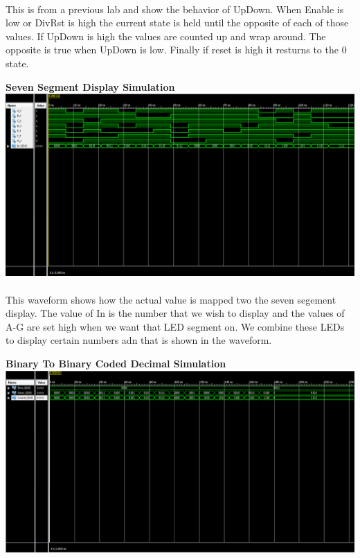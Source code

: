 \documentclass[12pt]{report}
\begin{document}
				\paragraph*{}
				This is from a previous lab and show the behavior of UpDown.  When Enable is low or DivRst is high the current state is held until the opposite of each of those values.  If UpDown is high the values are counted up and wrap around.  The opposite is true when UpDown is low.  Finally if reset is high it resturns to the 0 state.
				\newpage

			\begin{center}
				\textbf{Seven Segment Display Simulation}
				\includegraphics[scale=.45]{seg.PNG}
			\end{center}
				\paragraph*{}
				This waveform shows how the actual value is mapped two the seven segement display.  The value of In is the number that we wish to display and the values of A-G are set high when we want that LED segment on.  We combine these LEDs to display certain numbers adn that is shown in the waveform.

			\begin{center}
				\textbf{Binary To Binary Coded Decimal Simulation}
				\includegraphics[scale=.45]{b2bcd.PNG}
			\end{center}
\end{document}
